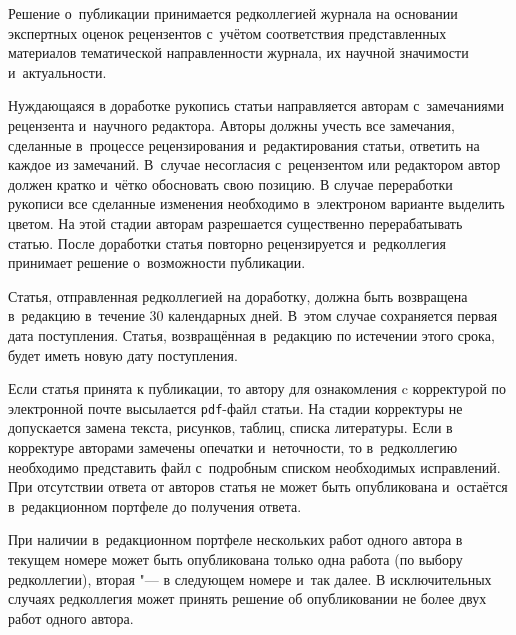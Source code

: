 Решение о~публикации принимается редколлегией журнала на основании экспертных оценок рецензентов с~учётом соответствия представленных материалов тематической направленности журнала, их научной значимости и~актуальности. 

Нуждающаяся в доработке рукопись статьи направляется авторам с~замечаниями рецензента и~научного редактора.
Авторы должны учесть все замечания, сделанные в~процессе рецензирования и~редактирования статьи, ответить на каждое из замечаний. 
В~случае несогласия с~рецензентом или редактором автор должен кратко и~чётко обосновать свою позицию. 
В случае переработки рукописи все сделанные изменения необходимо в~электроном варианте выделить цветом.
На этой стадии  авторам разрешается существенно перерабатывать статью.
После доработки статья повторно рецензируется и~редколлегия принимает решение о~возможности публикации. 

Статья, отправленная редколлегией на доработку, должна быть возвращена в~редакцию в~течение 30 календарных дней. 
В~этом случае сохраняется первая дата поступления. 
Статья, возвращённая в~редакцию по истечении этого срока, будет иметь новую дату поступления. 

Если статья принята к публикации, то автору для ознакомления c корректурой по электронной почте высылается {\tt pdf}-файл статьи. 
На стадии корректуры не допускается замена текста, рисунков, таблиц, списка литературы.
Если в корректуре авторами замечены опечатки и~неточности, то в~редколлегию необходимо представить файл с~подробным списком необходимых исправлений. 
При отсутствии ответа от авторов статья не может быть опубликована и~остаётся в~редакционном портфеле до получения ответа.


При наличии в~редакционном портфеле нескольких работ одного автора в текущем номере может быть опубликована только одна работа (по выбору редколлегии), вторая "--- в следующем номере и~так далее. 
В исключительных случаях редколлегия может принять решение об опубликовании не более двух работ одного автора.




%

